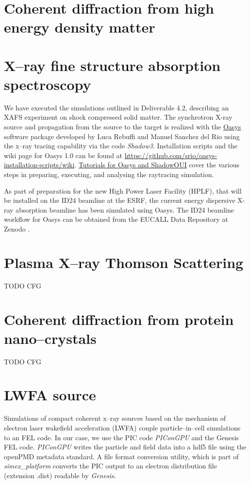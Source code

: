 \documentclass[12pt]{scrartcl}
\begin{document}
\section{Coherent diffraction from high energy density matter}\label{sec:plasma_diffraction}


\section{X--ray fine structure absorption spectroscopy\label{sec:xafs}}
%
We have executed the simulations outlined in Deliverable
4.2\cite{EUCALL_SIMEX_D4.2}, describing an XAFS experiment on shock compressed
solid matter.
The synchrotron X-ray source and propagation from the source to the target is
realized with the \href{http://ftp.esrf.eu/pub/scisoft/Oasys/readme.html}{Oasys}
software package developed by Luca Rebuffi and Manuel Sanchez del Rio
 using the x--ray tracing
capability via the code \textit{Shadow3}. Installation scripts and the wiki page for Oasys 1.0 can be
found at
\href{https://github.com/srio/oasys-installation-scripts/wiki}{https://github.com/srio/oasys-installation-scripts/wiki}.
\href{https://github.com/srio/ShadowOui-Tutorial}{Tutorials for
Oasys and ShadowOUI} cover the various steps in preparing, executing, and
analysing the raytracing simulation.

As part of preparation for the new High Power
Laser Facility (HPLF), that will be installed on the ID24 beamline at the ESRF,
the current energy dispersive X-ray absorption beamline has been simulated using
Oasys.
The ID24 beamline workflow for Oasys can be obtained from the EUCALL Data
Repository at Zenodo \cite{Briggs2017.zenodo.886451}.
\section{Plasma X--ray Thomson Scattering\label{sec:xrts}}
TODO CFG
%
\section{Coherent diffraction from protein nano--crystals\label{sec:protein_sfx}}
TODO CFG
%
\section{LWFA source}\label{sec:lwfa_source}
Simulations of compact coherent x--ray sources based on the mechanism of
electron laser wakefield acceleration (LWFA) couple particle--in--cell
simulations to an FEL code. In our case, we use the PIC code \textit{PIConGPU}
and the Genesis FEL code. \textit{PIConGPU} writes the particle and field data
into a hdf5 file using the openPMD \cite{Huebl2015} metadata standard. A file format conversion utility, which is part of
\textit{simex\_platform} converts the PIC output to an electron distribution
file (extension .dist) readable by \textit{Genesis}.

\printbibliography[notkeyword=report, notkeyword=zenodo, title={Journal articles}]
%
\printbibliography[keyword=eucall, keyword=report, title={EUCALL Reports}]
%
\printbibliography[keyword=zenodo, title={EUCALL Data Repository Depositions}]
\end{document}

